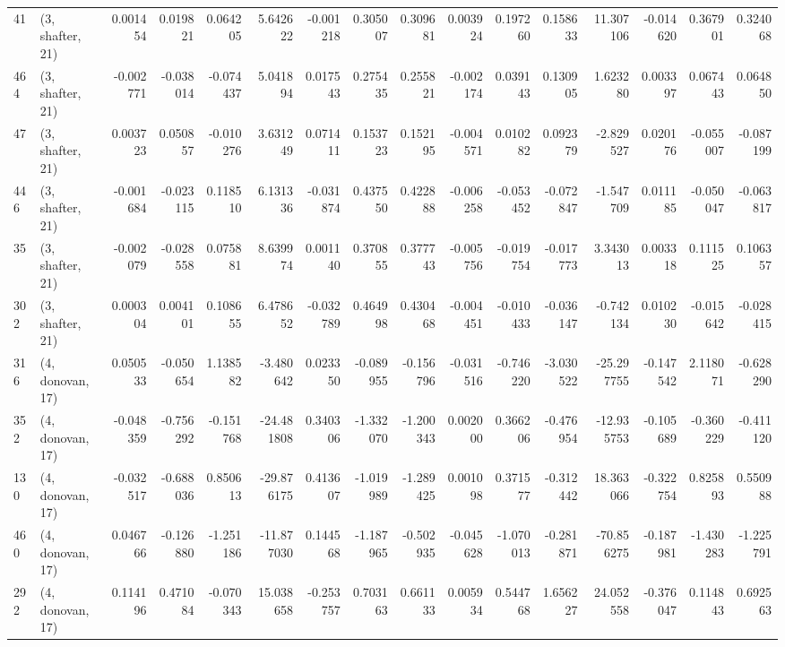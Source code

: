 \begin{tabular}{llrrrrrrrrrrrrrr}
41  &  (3, shafter, 21) &   0.001454 &  0.019821 &  0.064205 &    5.642622 & -0.001218 &   0.305007 &  0.309681 &  0.003924 &  0.197260 &  0.158633 &    11.307106 & -0.014620 &  0.367901 &  0.324068 \\
464 &  (3, shafter, 21) &  -0.002771 & -0.038014 & -0.074437 &    5.041894 &  0.017543 &   0.275435 &  0.255821 & -0.002174 &  0.039143 &  0.130905 &     1.623280 &  0.003397 &  0.067443 &  0.064850 \\
47  &  (3, shafter, 21) &   0.003723 &  0.050857 & -0.010276 &    3.631249 &  0.071411 &   0.153723 &  0.152195 & -0.004571 &  0.010282 &  0.092379 &    -2.829527 &  0.020176 & -0.055007 & -0.087199 \\
446 &  (3, shafter, 21) &  -0.001684 & -0.023115 &  0.118510 &    6.131336 & -0.031874 &   0.437550 &  0.422888 & -0.006258 & -0.053452 & -0.072847 &    -1.547709 &  0.011185 & -0.050047 & -0.063817 \\
35  &  (3, shafter, 21) &  -0.002079 & -0.028558 &  0.075881 &    8.639974 &  0.001140 &   0.370855 &  0.377743 & -0.005756 & -0.019754 & -0.017773 &     3.343013 &  0.003318 &  0.111525 &  0.106357 \\
302 &  (3, shafter, 21) &   0.000304 &  0.004101 &  0.108655 &    6.478652 & -0.032789 &   0.464998 &  0.430468 & -0.004451 & -0.010433 & -0.036147 &    -0.742134 &  0.010230 & -0.015642 & -0.028415 \\
316 &  (4, donovan, 17) &   0.050533 & -0.050654 &  1.138582 &   -3.480642 &  0.023350 &  -0.089955 & -0.156796 & -0.031516 & -0.746220 & -3.030522 &   -25.297755 & -0.147542 &  2.118071 & -0.628290 \\
352 &  (4, donovan, 17) &  -0.048359 & -0.756292 & -0.151768 &  -24.481808 &  0.340306 &  -1.332070 & -1.200343 &  0.002000 &  0.366206 & -0.476954 &   -12.935753 & -0.105689 & -0.360229 & -0.411120 \\
130 &  (4, donovan, 17) &  -0.032517 & -0.688036 &  0.850613 &  -29.876175 &  0.413607 &  -1.019989 & -1.289425 &  0.001098 &  0.371577 & -0.312442 &    18.363066 & -0.322754 &  0.825893 &  0.550988 \\
460 &  (4, donovan, 17) &   0.046766 & -0.126880 & -1.251186 &  -11.877030 &  0.144568 &  -1.187965 & -0.502935 & -0.045628 & -1.070013 & -0.281871 &   -70.856275 & -0.187981 & -1.430283 & -1.225791 \\
292 &  (4, donovan, 17) &   0.114196 &  0.471084 & -0.070343 &   15.038658 & -0.253757 &   0.703163 &  0.661133 &  0.005934 &  0.544768 &  1.656227 &    24.052558 & -0.376047 &  0.114843 &  0.692563 \\

\end{tabular}
